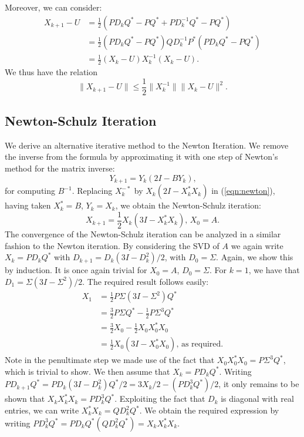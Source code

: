 \documentclass[12pt]{article}
\def\norm#1{\|#1\|}
\begin{document}
Moreover, we can consider:
\begin{align*}
  X_{k+1} - U & = \frac{1}{2}(PD_kQ^* - PQ^* + PD_k^{-1}Q^* - PQ^*) \\
  & = \frac{1}{2}(PD_kQ^* - PQ^*)QD_k^{-1}P^*(PD_kQ^* - PQ^*)\\
  & = \frac{1}{2}(X_k - U)X_k^{-1}(X_k - U)\text{.}
\end{align*}
We thus have the relation
\begin{equation}
  \norm{X_{k+1} - U} \leq \frac{1}{2}\norm{X_k^{-1}}\norm{X_k - U}^2\text{.}
\end{equation}

\subsection{Newton-Schulz Iteration}
We derive an alternative iterative method to the Newton Iteration. We remove
the inverse from the formula by approximating it with one step of Newton's
method for the matrix inverse:
\begin{equation}
  Y_{k+1} = Y_k(2I - BY_k)\text{,}
\end{equation}
for computing $B^{-1}$. Replacing $X_k^{-*}$ by $X_k(2I - X_k^*X_k)$ in
(\ref{eqn:newton}), having taken $X_k^* = B$, $Y_k = X_k$, we obtain the
Newton-Schulz iteration:
\begin{equation}
  X_{k+1} = \frac{1}{2}X_k(3I - X_k^*X_k)\text{, } X_0 = A\text{.}
\end{equation}
The convergence of the Newton-Schulz iteration can be analyzed in a similar
fashion to the Newton iteration. By considering the SVD of $A$ we again write
$X_k = PD_kQ^*$ with $D_{k+1} = D_k(3I - D_k^2)/2$, with $D_0 = \Sigma$. Again,
we show this by induction. It is once again trivial for $X_0 = A$,
$D_0 = \Sigma$. For $k = 1$, we have that $D_1 = \Sigma(3I - \Sigma^2)/2$. The
required result follows easily:
\begin{align*}
  X_{1} & = \frac{1}{2}P\Sigma(3I-\Sigma^2)Q^* \\
       & = \frac{3}{2}P\Sigma Q^* - \frac{1}{2}P\Sigma^3Q^* \\
       & = \frac{3}{2}X_0 - \frac{1}{2}X_0X_0^*X_0 \\
       & = \frac{1}{2}X_0(3I - X_0^*X_0)\text{, as required.}
\end{align*}
Note in the penultimate step we made use of the fact that
$X_0X_0^*X_0 = P\Sigma^3Q^*$, which is trivial to show. We then assume that
$X_k = PD_kQ^*$. Writing
$PD_{k+1}Q^* = PD_k(3I - D_k^2)Q^*/2 = 3X_k/2 - (PD_k^3Q^*)/2$, it only remains
to be shown that $X_kX_k^*X_k = PD_k^3Q^*$. Exploiting the fact that $D_k$ is
diagonal with real entries, we can write $X_k^*X_k = QD_k^2Q^*$. We obtain the
required expression by writing $PD_k^3Q^* = PD_kQ^*(QD_k^2Q^*) = X_kX_k^*X_k$.
\end{document}
